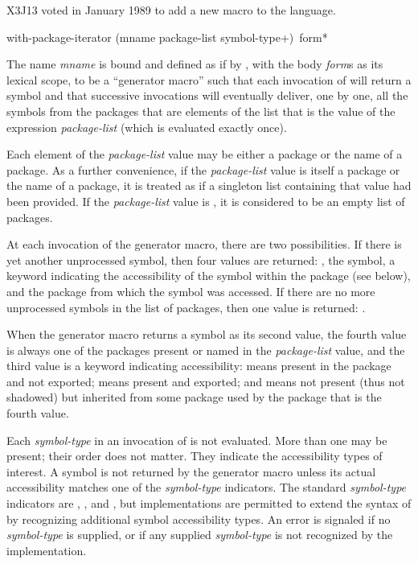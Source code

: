 \begin{new}
X3J13 voted in January 1989
to add a new macro  to the language.

\begin{defmac}
with-package-iterator (mname package-list {symbol-type}+)
                      {\,form}*

The name \emph{mname} is bound and defined as if by ,
with the body \emph{form\/}s as its lexical scope, to be a ``generator macro''
such that each invocation of  will
return a symbol and that successive invocations
will eventually deliver, one by one, all the symbols
from the packages that are elements of the list that is the value of the
expression \emph{package-list} (which is evaluated exactly once).

Each element of the \emph{package-list} value
may be either a package or the name of a package.
As a further convenience, if the \emph{package-list} value
is itself a package or the name of a package, it is treated
as if a singleton list containing that value had been provided.
If the \emph{package-list} value is , it is considered
to be an empty list of packages.

At each invocation of the generator macro, there are two possibilities.
If there is yet another unprocessed symbol, then
four values are returned: , the symbol,
a keyword
indicating the accessibility of the symbol within the package (see below), and
the package from which the symbol was accessed.
If there are no more unprocessed symbols in the
list of packages, then one value is returned: .

When the generator macro returns a symbol as its second value, the
fourth value is always one of the packages present or named in the
\emph{package-list} value, and the third value is a keyword indicating
accessibility:
 means present in the package and not exported;
 means present and exported;
and  means not present (thus not shadowed) but inherited
from some package used by the package that is the fourth value.

Each \emph{symbol-type} in an invocation of 
is not evaluated.  More than one may be present; their order does not
matter.  They indicate the accessibility types of interest.
A symbol is not returned by the generator macro unless its actual
accessibility matches one of the \emph{symbol-type} indicators.
The standard \emph{symbol-type} indicators are ,
, and , but implementations are permitted
to extend the syntax of  by recognizing
additional symbol accessibility types.  An error is signaled
if no \emph{symbol-type} is supplied, or if any supplied \emph{symbol-type}
is not recognized by the implementation.


\end{defmac}
\end{new}
